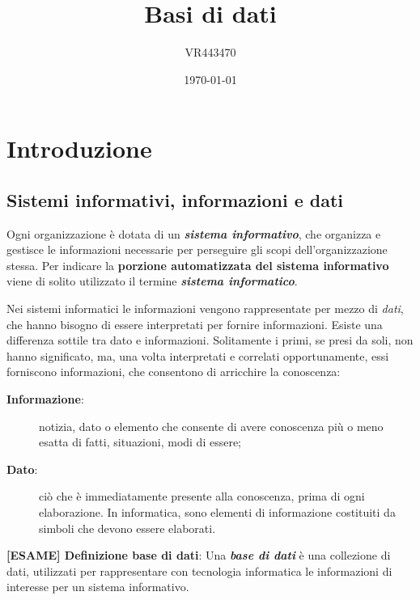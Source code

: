 \documentclass[a4paper]{article}
\begin{document}
	\author{VR443470}
	\title{Basi di dati}
	\date{\printdayoff\today}
	\maketitle

	\newpage
	
	\tableofcontents
	
	\newpage
		
	\section{Introduzione}
	
	\subsection{Sistemi informativi, informazioni e dati}
	
	Ogni organizzazione è dotata di un \textbf{\emph{sistema informativo}}, che organizza e gestisce le informazioni necessarie per perseguire gli scopi dell'organizzazione stessa. Per indicare la \textbf{porzione automatizzata del sistema informativo} viene di solito utilizzato il termine \textbf{\emph{sistema informatico}}.
	
	Nei sistemi informatici le informazioni vengono rappresentate per mezzo di \emph{dati}, che hanno bisogno di essere interpretati per fornire informazioni. Esiste una differenza sottile tra dato e informazioni. Solitamente i primi, se presi da soli, non hanno significato, ma, una volta interpretati e correlati opportunamente, essi forniscono informazioni, che consentono di arricchire la conoscenza:

	\begin{description}
		\item[\textbf{Informazione}:] notizia, dato o elemento che consente di avere conoscenza più o meno esatta di fatti, situazioni, modi di essere;
		\item[\textbf{Dato}:] ciò che è immediatamente presente alla conoscenza, prima di ogni elaborazione. In informatica, sono elementi di informazione costituiti da simboli che devono essere elaborati.
	\end{description}
	
	\noindent
	\textcolor{Red3}{\textbf{[ESAME] Definizione base di dati}}: Una \textbf{\emph{base di dati}} è una collezione di dati, utilizzati per rappresentare con tecnologia informatica le informazioni di interesse per un sistema informativo.
	
\end{document}
